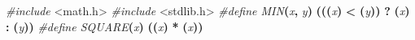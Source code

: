 \documentclass[
  12pt,
]{article}
\newenvironment{Shaded}{\begin{snugshade}}{\end{snugshade}}
\newcommand{\ImportTok}[1]{#1}
\newcommand{\OperatorTok}[1]{\textcolor[rgb]{0.81,0.36,0.00}{\textbf{#1}}}
\newcommand{\PreprocessorTok}[1]{\textcolor[rgb]{0.56,0.35,0.01}{\textit{#1}}}
\begin{document}
\begin{Shaded}
\begin{Highlighting}[]
\PreprocessorTok{\#include }\ImportTok{\textless{}math.h\textgreater{}}
\PreprocessorTok{\#include }\ImportTok{\textless{}stdlib.h\textgreater{}}
\PreprocessorTok{\#define MIN}\OperatorTok{(}\PreprocessorTok{x}\OperatorTok{,}\PreprocessorTok{ y}\OperatorTok{)}\PreprocessorTok{ }\OperatorTok{(((}\PreprocessorTok{x}\OperatorTok{)}\PreprocessorTok{ }\OperatorTok{\textless{}}\PreprocessorTok{ }\OperatorTok{(}\PreprocessorTok{y}\OperatorTok{))}\PreprocessorTok{ }\OperatorTok{?}\PreprocessorTok{ }\OperatorTok{(}\PreprocessorTok{x}\OperatorTok{)}\PreprocessorTok{ }\OperatorTok{:}\PreprocessorTok{ }\OperatorTok{(}\PreprocessorTok{y}\OperatorTok{))}
\PreprocessorTok{\#define SQUARE}\OperatorTok{(}\PreprocessorTok{x}\OperatorTok{)}\PreprocessorTok{ }\OperatorTok{((}\PreprocessorTok{x}\OperatorTok{)}\PreprocessorTok{ }\OperatorTok{*}\PreprocessorTok{ }\OperatorTok{(}\PreprocessorTok{x}\OperatorTok{))}


\end{Highlighting}
\end{Shaded}
\end{document}
